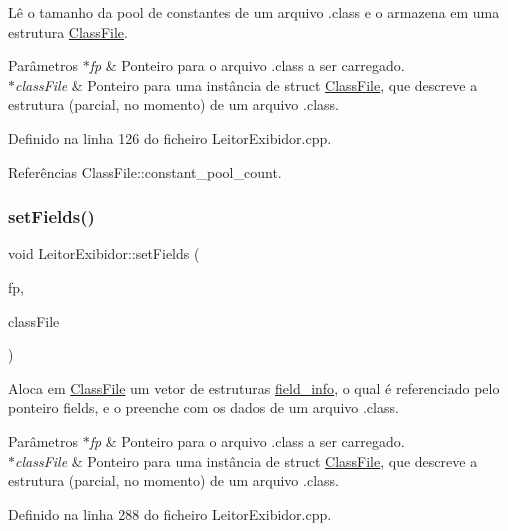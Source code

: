 Lê o tamanho da pool de constantes de um arquivo .class e o armazena em uma estrutura \hyperlink{classClassFile}{Class\+File}. 
\begin{DoxyParams}{Parâmetros}
{\em $\ast$fp} & Ponteiro para o arquivo .class a ser carregado. \\
\hline
{\em $\ast$class\+File} & Ponteiro para uma instância de struct \hyperlink{classClassFile}{Class\+File}, que descreve a estrutura (parcial, no momento) de um arquivo .class. \\
\hline
\end{DoxyParams}


Definido na linha 126 do ficheiro Leitor\+Exibidor.\+cpp.



Referências Class\+File\+::constant\+\_\+pool\+\_\+count.

\mbox{\label{classLeitorExibidor_a682c7ad4fd18b4dce390285c3c643b7b}} 
\subsubsection{\texorpdfstring{set\+Fields()}{setFields()}}
{\footnotesize\ttfamily void Leitor\+Exibidor\+::set\+Fields (\begin{DoxyParamCaption}\item[{F\+I\+LE $\ast$}]{fp,  }\item[{\hyperlink{classClassFile}{Class\+File} $\ast$}]{class\+File }\end{DoxyParamCaption})\hspace{0.3cm}{\ttfamily [private]}}

Aloca em \hyperlink{classClassFile}{Class\+File} um vetor de estruturas \hyperlink{structfield__info}{field\+\_\+info}, o qual é referenciado pelo ponteiro fields, e o preenche com os dados de um arquivo .class. 
\begin{DoxyParams}{Parâmetros}
{\em $\ast$fp} & Ponteiro para o arquivo .class a ser carregado. \\
\hline
{\em $\ast$class\+File} & Ponteiro para uma instância de struct \hyperlink{classClassFile}{Class\+File}, que descreve a estrutura (parcial, no momento) de um arquivo .class. \\
\hline
\end{DoxyParams}


Definido na linha 288 do ficheiro Leitor\+Exibidor.\+cpp.



